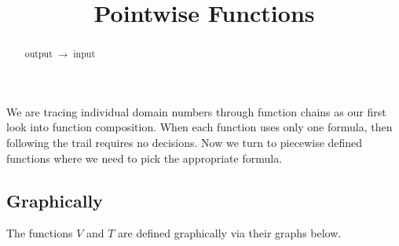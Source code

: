 \documentclass{ximera}
\title{Pointwise Functions}
\begin{document}
\begin{abstract}
output $\rightarrow$ input
\end{abstract}
\maketitle


We are tracing individual domain numbers through function chains as our first look into function composition.  When each function uses only one formula, then following the trail requires no decisions.  Now we turn to piecewise defined functions where we need to pick the appropriate formula.








\subsection*{Graphically}




The functions $V$ and $T$ are defined graphically via their graphs below.  
\end{document}
